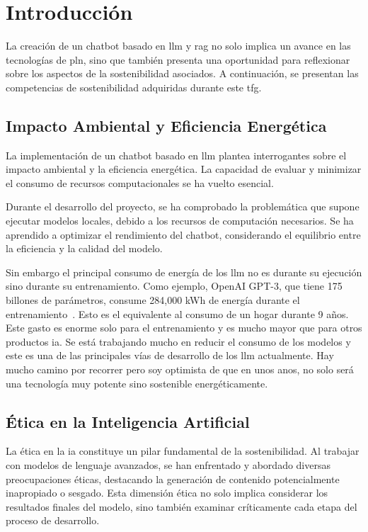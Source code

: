 
\section{Introducción}
La creación de un chatbot basado en \acrlong{llm} y \acrlong{rag} no solo implica un avance en las tecnologías de \acrlong{pln}, sino que también presenta una oportunidad para reflexionar sobre los aspectos de la sostenibilidad asociados. A continuación, se presentan las competencias de sostenibilidad adquiridas durante este \acrlong{tfg}.

\subsection{Impacto Ambiental y Eficiencia Energética}

La implementación de un chatbot basado en \acrshort{llm} plantea interrogantes sobre el impacto ambiental y la eficiencia energética. La capacidad de evaluar y minimizar el consumo de recursos computacionales se ha vuelto esencial. 

Durante el desarrollo del proyecto, se ha comprobado la problemática que supone ejecutar modelos locales, debido a los recursos de computación necesarios. Se ha aprendido a optimizar el rendimiento del chatbot, considerando el equilibrio entre la eficiencia y la calidad del modelo.

Sin embargo el principal consumo de energía de los \acrshort{llm} no es durante su ejecución sino durante su entrenamiento. Como ejemplo, OpenAI GPT-3, que tiene 175 billones de parámetros, consume 284,000 kWh de energía durante el entrenamiento~\cite{PowerLLM}. Esto es el equivalente al consumo de un hogar durante 9 años. Este gasto es enorme solo para el entrenamiento y es mucho mayor que para otros productos \acrshort{ia}. Se está trabajando mucho en reducir el consumo de los modelos y este es una de las principales vías de desarrollo de los \acrshort{llm} actualmente. Hay mucho camino por recorrer pero soy optimista de que en unos anos, no solo será una tecnología muy potente sino sostenible energéticamente.

\subsection{Ética en la Inteligencia Artificial}

La ética en la \acrlong{ia} constituye un pilar fundamental de la sostenibilidad. Al trabajar con modelos de lenguaje avanzados, se han enfrentado y abordado diversas preocupaciones éticas, destacando la generación de contenido potencialmente inapropiado o sesgado. Esta dimensión ética no solo implica considerar los resultados finales del modelo, sino también examinar críticamente cada etapa del proceso de desarrollo.

